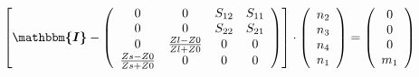 \[ \left[ \boldsymbol{\mathbbm{I}}  - \left(\begin{array}{cccc} 0 & 0
& S_{12} & S_{11} \\ 0 & 0 & S_{22} & S_{21} \\ 0 & \frac{ Zl -Z0}{ Zl
+Z0} & 0 & 0 \\ \frac{ Zs -Z0}{ Zs +Z0} & 0 & 0 & 0
\end{array}\right)\right] \cdot \left(\begin{array}{c} n_{2} \\ n_{3}
\\ n_{4} \\ n_{1} \end{array}\right) = \left(\begin{array}{c} 0 \\ 0
\\ 0 \\ m_{1} \end{array}\right) \]

